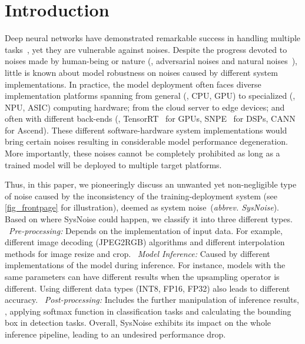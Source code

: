 \section{Introduction}



Deep neural networks have demonstrated remarkable success in handling multiple tasks~\cite{AlexNet,VGG,ResNet,devlin2018bert,GPT3}, yet they are vulnerable against noises. Despite the progress devoted to noises made by human-being or nature  (\eg, adversarial noises \cite{goodfellow2014explaining} and natural noises~\cite{hendrycks2019robustness}), little is known about model robustness on noises caused by different system implementations. In practice, the model deployment often faces diverse implementation platforms spanning from general (\eg, CPU, GPU) to specialized (\eg, NPU, ASIC) computing hardware; from the cloud server to edge devices; and often with different back-ends (\eg, TensorRT~\cite{tensorrt} for GPUs, SNPE~\cite{snpe} for DSPs, CANN~\cite{cann} for Ascend). These different software-hardware system implementations would bring certain noises resulting in considerable model performance degeneration. More importantly, these noises cannot be completely prohibited as long as a trained model will be deployed to multiple target platforms.

Thus, in this paper, we pioneeringly discuss an unwanted yet non-negligible type of noise caused by the inconsistency of the training-deployment system (see \autoref{fig_frontpage} for illustration), deemed as system noise~(\textit{abbrev. SysNoise}). Based on where SysNoise could happen, we classify it into three different types. ~\textit{Pre-processing:} Depends on the implementation of input data. For example, different image decoding (JPEG2RGB) algorithms and different interpolation methods for image resize and crop. %
~\textit{Model Inference:} Caused by different implementations of the model during inference. For instance, models with the same parameters can have different results when the upsampling operator is different. Using different data types (INT8, FP16, FP32) also leads to different accuracy. ~\textit{Post-processing:} Includes the further manipulation of inference results, \eg, applying softmax function in classification tasks and calculating the bounding box in detection tasks. Overall, SysNoise exhibits its impact on the whole inference pipeline, leading to an undesired performance drop.

